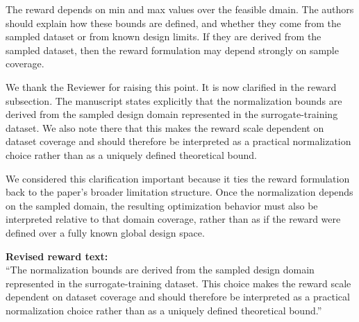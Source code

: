 \begin{ReviewerComment}
The reward depends on min and max values over the feasible dmain. The authors should explain how these bounds are defined, and whether they come from the sampled dataset or from known design limits. If they are derived from the sampled dataset, then the reward formulation may depend strongly on sample coverage.
\end{ReviewerComment}
%
\begin{Answer}
We thank the Reviewer for raising this point. It is now clarified in the reward subsection. The manuscript states explicitly that the normalization bounds are derived from the sampled design domain represented in the surrogate-training dataset. We also note there that this makes the reward scale dependent on dataset coverage and should therefore be interpreted as a practical normalization choice rather than as a uniquely defined theoretical bound.

We considered this clarification important because it ties the reward formulation back to the paper's broader limitation structure. Once the normalization depends on the sampled domain, the resulting optimization behavior must also be interpreted relative to that domain coverage, rather than as if the reward were defined over a fully known global design space.
\end{Answer}
\begin{RevisionExcerpt}
\noindent\textbf{Revised reward text:}\\
``The normalization bounds are derived from the sampled design domain represented in the surrogate-training dataset. This choice makes the reward scale dependent on dataset coverage and should therefore be interpreted as a practical normalization choice rather than as a uniquely defined theoretical bound.''
\end{RevisionExcerpt}

